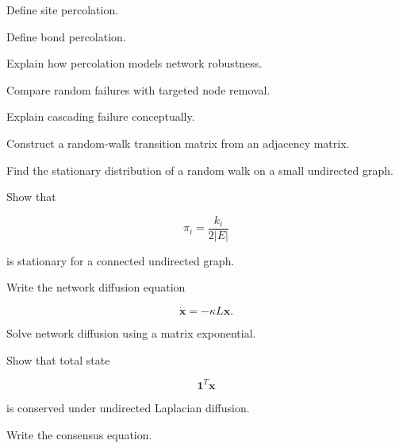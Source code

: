 \begin{exercise}[2]
Define site percolation.
\end{exercise}

\begin{exercise}[2]
Define bond percolation.
\end{exercise}

\begin{exercise}[3]
Explain how percolation models network robustness.
\end{exercise}

\begin{exercise}[3]
Compare random failures with targeted node removal.
\end{exercise}

\begin{exercise}[3]
Explain cascading failure conceptually.
\end{exercise}

\begin{exercise}[2]
Construct a random-walk transition matrix from an adjacency matrix.
\end{exercise}

\begin{exercise}[3]
Find the stationary distribution of a random walk on a small undirected
graph.
\end{exercise}

\begin{exercise}[3]
Show that

\[
\pi_i
=
\frac{k_i}{2|E|}
\]

is stationary for a connected undirected graph.
\end{exercise}

\begin{exercise}[2]
Write the network diffusion equation

\[
\dot{\mathbf{x}}
=
-\kappa L\mathbf{x}.
\]
\end{exercise}

\begin{exercise}[3]
Solve network diffusion using a matrix exponential.
\end{exercise}

\begin{exercise}[3]
Show that total state

\[
\mathbf{1}^T\mathbf{x}
\]

is conserved under undirected Laplacian diffusion.
\end{exercise}

\begin{exercise}[2]
Write the consensus equation.
\end{exercise}

